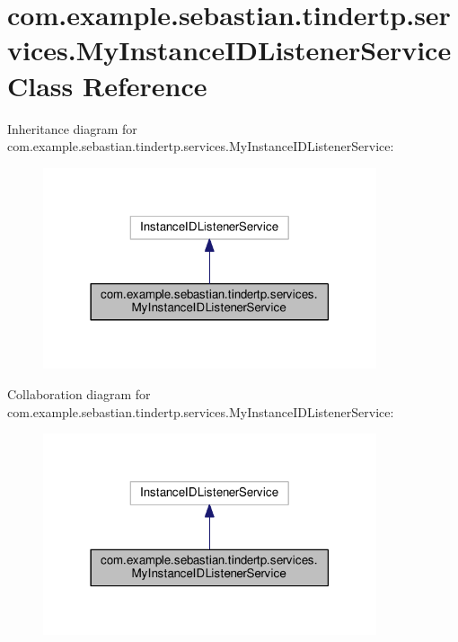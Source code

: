 \hypertarget{classcom_1_1example_1_1sebastian_1_1tindertp_1_1services_1_1MyInstanceIDListenerService}{}\section{com.\+example.\+sebastian.\+tindertp.\+services.\+My\+Instance\+I\+D\+Listener\+Service Class Reference}
\label{classcom_1_1example_1_1sebastian_1_1tindertp_1_1services_1_1MyInstanceIDListenerService}


Inheritance diagram for com.\+example.\+sebastian.\+tindertp.\+services.\+My\+Instance\+I\+D\+Listener\+Service\+:
\nopagebreak
\begin{figure}[H]
\begin{center}
\leavevmode
\includegraphics[width=278pt]{classcom_1_1example_1_1sebastian_1_1tindertp_1_1services_1_1MyInstanceIDListenerService__inherit__graph}
\end{center}
\end{figure}


Collaboration diagram for com.\+example.\+sebastian.\+tindertp.\+services.\+My\+Instance\+I\+D\+Listener\+Service\+:
\nopagebreak
\begin{figure}[H]
\begin{center}
\leavevmode
\includegraphics[width=278pt]{classcom_1_1example_1_1sebastian_1_1tindertp_1_1services_1_1MyInstanceIDListenerService__coll__graph}
\end{center}
\end{figure}
